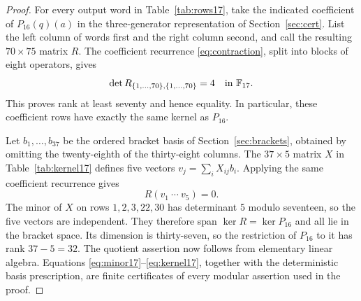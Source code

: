\begin{proof}
For every output word in Table~\ref{tab:rows17}, take the indicated
coefficient of $P_{16}(q)(a)$ in the three-generator representation of
Section~\ref{sec:cert}.  List the left column of words first and the
right column second, and call the resulting $70\times75$ matrix $R$.
The coefficient recurrence \eqref{eq:contraction}, split into blocks of
eight operators, gives
\begin{equation}
 \det R_{\{1,\ldots,70\},\{1,\ldots,70\}}=4\quad\text{in }\mathbb F_{17}.
 \label{eq:minor17}
\end{equation}
This proves rank at least seventy and hence equality.  In particular,
these coefficient rows have exactly the same kernel as $P_{16}$.

Let $b_1,\ldots,b_{37}$ be the ordered bracket basis of
Section~\ref{sec:brackets}, obtained by omitting the twenty-eighth of the
thirty-eight columns.  The $37\times5$ matrix $X$ in
Table~\ref{tab:kernel17} defines five vectors
$v_j=\sum_i X_{ij}b_i$.  Applying the same coefficient recurrence gives
\begin{equation}
 R(v_1\ \cdots\ v_5)=0.
 \label{eq:kernel17}
\end{equation}
The minor of $X$ on rows $1,2,3,22,30$ has determinant $5$ modulo
seventeen, so the five vectors are independent.  They therefore span
$\ker R=\ker P_{16}$ and all lie in the bracket space.  Its dimension
is thirty-seven, so the restriction of $P_{16}$ to it has rank
$37-5=32$.  The quotient assertion now follows from elementary linear
algebra.  Equations \eqref{eq:minor17}--\eqref{eq:kernel17}, together
with the deterministic basis prescription, are finite certificates of
every modular assertion used in the proof.
\end{proof}




